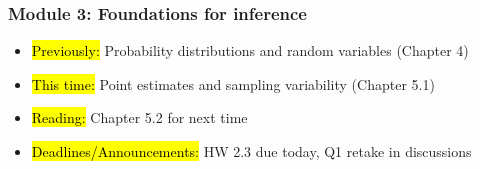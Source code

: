 
\begin{frame}
    \frametitle{Module 3: Foundations for inference}
    \begin{itemize}
        \item \hl{Previously: } Probability distributions and random variables (Chapter 4)
        \item \hl{This time: } Point estimates and sampling variability (Chapter 5.1)
        \item \hl{Reading: } Chapter 5.2 for next time
        \item \hl{Deadlines/Announcements: } HW 2.3 due today, Q1 retake in discussions
    \end{itemize}
    
    \end{frame}
    